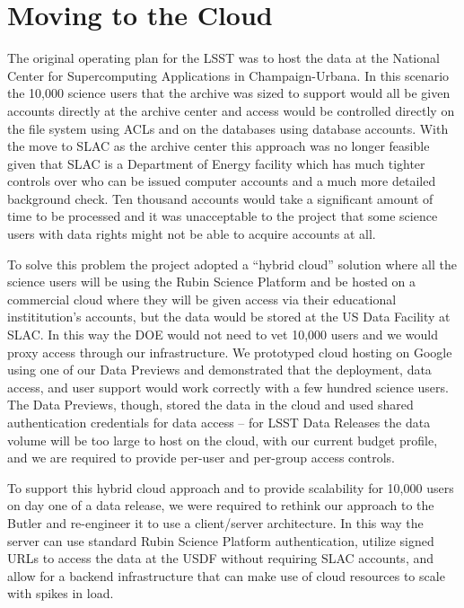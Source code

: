 \section{Moving to the Cloud}

The original operating plan for the LSST was to host the data at the National Center for Supercomputing Applications in Champaign-Urbana. \cite{2012SPIE.8451E..0VF}
In this scenario the 10,000 science users that the archive was sized to support would all be given accounts directly at the archive center and access would be controlled directly on the file system using ACLs and on the databases using database accounts.
With the move to SLAC as the archive center \cite{RTN-021} this approach was no longer feasible given that SLAC is a Department of Energy facility which has much tighter controls over who can be issued computer accounts and a much more detailed background check.
Ten thousand accounts would take a significant amount of time to be processed and it was unacceptable to the project that some science users with data rights might not be able to acquire accounts at all.

To solve this problem the project adopted a ``hybrid cloud'' solution \cite{2024SPIE13101.86Otmp} where all the science users will be using the Rubin Science Platform \cite{LDM-542} and be hosted on a commercial cloud where they will be given access via their educational instititution's accounts, but the data would be stored at the US Data Facility at SLAC.
In this way the DOE would not need to vet 10,000 users and we would proxy access through our infrastructure.
We prototyped cloud hosting on Google using one of our Data Previews \cite{2021arXiv211115030O} and demonstrated that the deployment, data access, and user support would work correctly with a few hundred science users.
The Data Previews, though, stored the data in the cloud and used shared authentication credentials for data access -- for LSST Data Releases the data volume will be too large to host on the cloud, with our current budget profile, and we are required to provide per-user and per-group access controls.

To support this hybrid cloud approach and to provide scalability for 10,000 users on day one of a data release, we were required to rethink our approach to the Butler and re-engineer it to use a client/server architecture.
In this way the server can use standard Rubin Science Platform authentication, \cite{DMTN-182} utilize signed URLs to access the data at the USDF without requiring SLAC accounts, \cite{DMTN-284} and allow for a backend infrastructure that can make use of cloud resources to scale with spikes in load.

